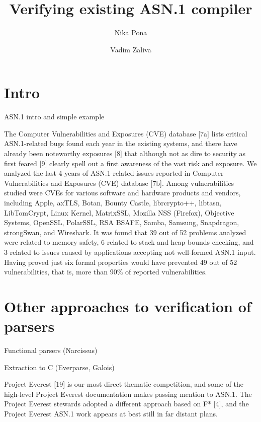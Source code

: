 \documentclass[acmsmall,nonacm]{acmart}
\begin{document}
\title{Verifying existing ASN.1 compiler}

\author{Nika Pona}
\author{Vadim Zaliva}

\maketitle

\begin{abstract}

\end{abstract}

\section{Intro}
 ASN.1 intro and simple example 

 The Computer Vulnerabilities and Exposures (CVE) database [7a] lists critical ASN.1-related bugs found each year in the existing systems, and there have already been noteworthy exposures [8] that although not as dire to security as first feared [9] clearly spell out a first awareness of the vast risk and exposure. We analyzed the last 4 years of ASN.1-related issues reported in Computer Vulnerabilities and Exposures (CVE) database [7b]. Among vulnerabilities studied were CVEs for various software and hardware products and vendors, including Apple, axTLS, Botan, Bounty Castle, librcrypto++, libtasn, LibTomCrypt, Linux Kernel, MatrixSSL, Mozilla NSS (Firefox), Objective Systems, OpenSSL, PolarSSL, RSA BSAFE, Samba, Samsung, Snapdragon, strongSwan, and Wireshark. It was found that 39 out of 52 problems analyzed were related to memory safety, 6 related to stack and heap bounds checking, and 3 related to issues caused by applications accepting not well-formed ASN.1 input. Having proved just six formal properties would have prevented 49 out of 52 vulnerabilities, that is, more than 90\% of reported vulnerabilities.

 \section{Other approaches to verification of parsers}

  Functional parsers (Narcissus)

  Extraction to C (Everparse, Galois)

  Project Everest [19] is our most direct thematic competition, and some of the high-level Project Everest documentation makes passing mention to ASN.1. The Project Everest stewards adopted a different approach based on F* [4], and the Project Everest ASN.1 work  appears at best still in far distant plans.
\end{document}
